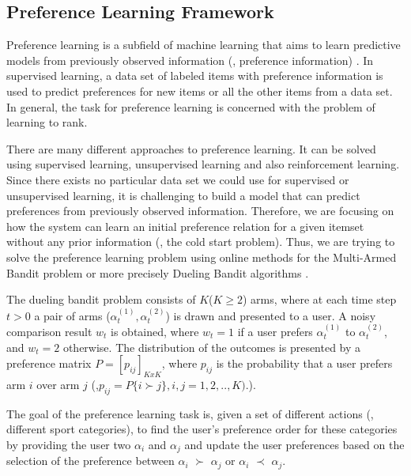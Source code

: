 \documentclass[twocolumn]{svjour3}          %
\begin{document}
\hypertarget{preference-learning-framework}{%
\subsection{\texorpdfstring{Preference Learning Framework
\label{sec:framework}}{Preference Learning Framework }}\label{preference-learning-framework}}


Preference learning is a subfield of machine learning that aims to learn
predictive models from previously observed information (\ie{},
preference information) \autocite{Fuernkranz2011}. In supervised
learning, a data set of labeled items with preference information is
used to predict preferences for new items or all the other items from a
data set. In general, the task for preference learning is concerned with
the problem of learning to rank.

There are many different approaches to preference learning. It can be
solved using supervised learning, unsupervised learning and also
reinforcement learning. Since there exists no particular data set we
could use for supervised or unsupervised learning, it is challenging to
build a model that can predict preferences from previously observed
information. Therefore, we are focusing on how the system can learn an
initial preference relation for a given itemset without any prior
information (\ie{}, the cold start problem). Thus, we are trying to
solve the preference learning problem using online methods for the
Multi-Armed Bandit problem or more precisely Dueling Bandit algorithms
\autocite{yue2012k}.

The dueling bandit problem consists of \(K\)(\(K\geq2\)) arms, where at
each time step \(t>0\) a pair of arms
(\(\alpha_{t}^{(1)},\alpha_{t}^{(2)}\)) is drawn and presented to a
user. A noisy comparison result \(w_{t}\) is obtained, where \(w_{t}=1\)
if a user prefers \(\alpha_{t}^{(1)}\) to \(\alpha_{t}^{(2)}\), and
\(w_{t}=2\) otherwise. The distribution of the outcomes is presented by
a preference matrix \(P=[p_{ij}]_{KxK}\), where \(p_{ij}\) is the
probability that a user prefers arm \(i\) over arm \(j\)
(\eg{},\(p_{ij} = P\{i\succ j\}, i,j = 1,2,..,K).\)).

The goal of the preference learning task is, given a set of different
actions (\eg{}, different sport categories), to find the user's
preference order for these categories by providing the user two
\(\alpha_{i}\) and \(\alpha_{j}\) and update the user preferences based
on the selection of the preference between \(\alpha_i\) \(\succ\)
\(\alpha_j\) or \(\alpha_i\) \(\prec\) \(\alpha_j\).
\end{document}
